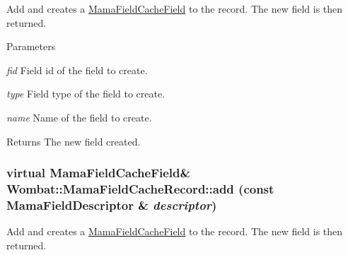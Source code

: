 Add and creates a {\ttfamily \hyperlink{classWombat_1_1MamaFieldCacheField}{MamaFieldCacheField}} to the record. The new field is then returned.


\begin{DoxyParams}{Parameters}
\item[{\em fid}]Field id of the field to create. \item[{\em type}]Field type of the field to create. \item[{\em name}]Name of the field to create. \end{DoxyParams}
\begin{DoxyReturn}{Returns}
The new field created. 
\end{DoxyReturn}
\hypertarget{classWombat_1_1MamaFieldCacheRecord_a554576f226821f33a6c8ec3e1421d71b}{
\subsubsection[{add}]{\setlength{\rightskip}{0pt plus 5cm}virtual {\bf MamaFieldCacheField}\& Wombat::MamaFieldCacheRecord::add (const {\bf MamaFieldDescriptor} \& {\em descriptor})}}
\label{classWombat_1_1MamaFieldCacheRecord_a554576f226821f33a6c8ec3e1421d71b}


Add and creates a {\ttfamily \hyperlink{classWombat_1_1MamaFieldCacheField}{MamaFieldCacheField}} to the record. The new field is then returned.


